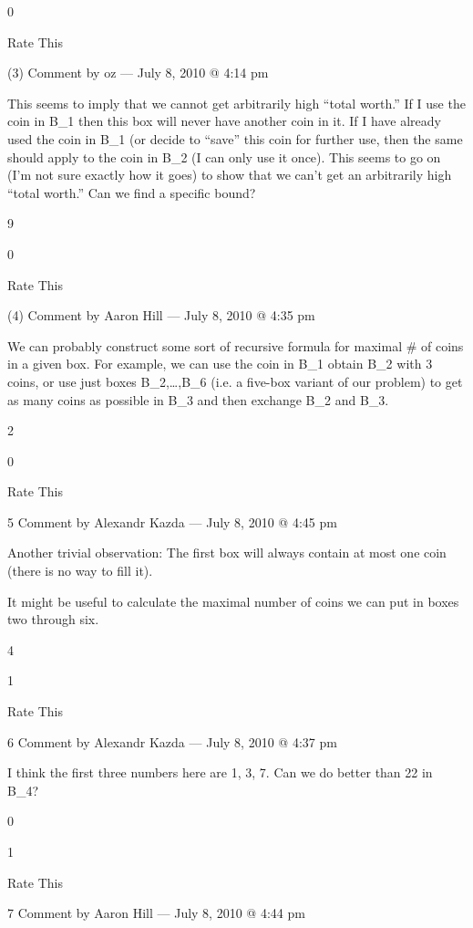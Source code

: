     0
     
    Rate This

  (3)  Comment by oz — July 8, 2010 @ 4:14 pm

        This seems to imply that we cannot get arbitrarily high “total worth.” If I use the coin in B_1 then this box will never have another coin in it. If I have already used the coin in B_1 (or decide to “save” this coin for further use, then the same should apply to the coin in B_2 (I can only use it once). This seems to go on (I’m not sure exactly how it goes) to show that we can’t get an arbitrarily high “total worth.” Can we find a specific bound?
         
        9
         
        0
         
        Rate This

     (4)   Comment by Aaron Hill — July 8, 2010 @ 4:35 pm

            We can probably construct some sort of recursive formula for maximal # of coins in a given box. For example, we can use the coin in B_1 obtain B_2 with 3 coins, or use just boxes B_2,…,B_6 (i.e. a five-box variant of our problem) to get as many coins as possible in B_3 and then exchange B_2 and B_3.
             
            2
             
            0
             
            Rate This

      5      Comment by Alexandr Kazda — July 8, 2010 @ 4:45 pm

        Another trivial observation: The first box will always contain at most one coin (there is no way to fill it).

        It might be useful to calculate the maximal number of coins we can put in boxes two through six.
         
        4
         
        1
         
        Rate This

     6   Comment by Alexandr Kazda — July 8, 2010 @ 4:37 pm

            I think the first three numbers here are 1, 3, 7. Can we do better than 22 in B_4?
             
            0
             
            1
             
            Rate This

      7      Comment by Aaron Hill — July 8, 2010 @ 4:44 pm

